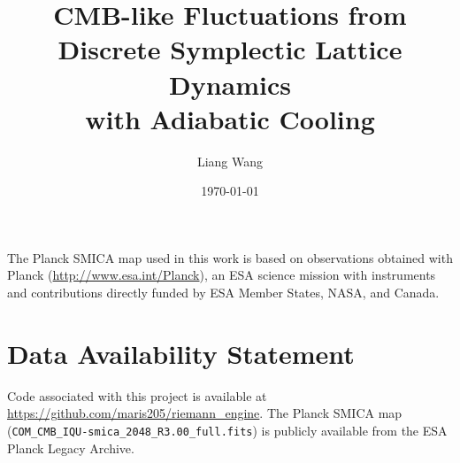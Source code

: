 \documentclass[aps,prd,twocolumn,superscriptaddress,nofootinbib]{revtex4-2}
\begin{document}
\title{CMB-like Fluctuations from Discrete Symplectic Lattice Dynamics\\with Adiabatic Cooling}

\author{Liang Wang}

\date{\today}



\maketitle









\begin{acknowledgments}
The Planck SMICA map used in this work is based on observations obtained with Planck (\url{http://www.esa.int/Planck}), an ESA science mission with instruments and contributions directly funded by ESA Member States, NASA, and Canada.
\end{acknowledgments}

\section*{Data Availability Statement}
Code associated with this project is available at \url{https://github.com/maris205/riemann_engine}.
The Planck SMICA map (\texttt{COM\_CMB\_IQU-smica\_2048\_R3.00\_full.fits}) is publicly available from the ESA Planck Legacy Archive.



\appendix

\end{document}
